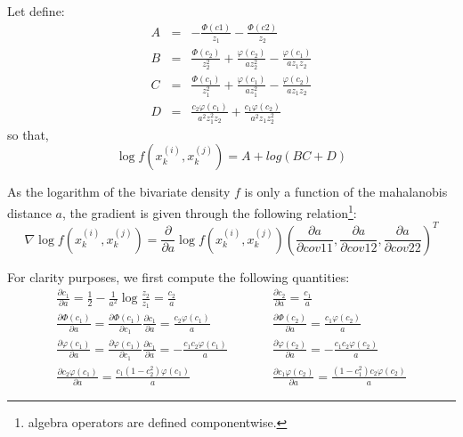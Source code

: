 \documentclass{article}
\begin{document}
Let define:
\begin{eqnarray*}
  A &=& - \frac{\Phi(c1)}{z_1} - \frac{\Phi(c2)}{z_2}\\
  B &=& \frac{\Phi(c_2)}{z_2^2} + \frac{\varphi(c_2)}{az_2^2} -
  \frac{\varphi(c_1)}{az_1z_2}\\
  C &=& \frac{\Phi(c_1)}{z_1^2} + \frac{\varphi(c_1)}{az_1^2} -
  \frac{\varphi(c_2)}{az_1z_2}\\
  D &=& \frac{c_2 \varphi(c_1)}{a^2z_1^2z_2} + \frac{c_1
    \varphi(c_2)}{a^2z_1z_2^2}  
\end{eqnarray*}
so that,
\begin{equation*}
  \log f(x_k^{(i)}, x_k^{(j)}) = A + log(B C + D)
\end{equation*}

As the logarithm of the bivariate density $f$ is only a function of the
mahalanobis distance $a$, the gradient is given through the following
relation\footnote{algebra operators are defined componentwise.}:
\begin{equation*}
  \nabla \log f(x_k^{(i)}, x_k^{(j)}) = \frac{\partial}{\partial a}
  \log f(x_k^{(i)}, x_k^{(j)}) \left( \frac{\partial a}{\partial
      cov{11}}, \frac{\partial a}{\partial cov{12}}, \frac{\partial
      a}{\partial cov{22}} \right)^T
\end{equation*}

For clarity purposes, we first compute the following quantities:
\begin{eqnarray*}
  \frac{\partial c_1}{\partial a} = \frac{1}{2} - \frac{1}{a^2} \log
  \frac{z_2}{z_1} = \frac{c_2}{a} &\qquad& \frac{\partial c_2}{\partial
    a} = \frac{c_1}{a}\\
  \frac{\partial \Phi(c_1)}{\partial a} = \frac{\partial
    \Phi(c_1)}{\partial c_1} \frac{\partial c_1}{\partial a} =
  \frac{c_2 \varphi(c_1)}{a} &\qquad& \frac{\partial
    \Phi(c_2)}{\partial a} = \frac{c_1 \varphi(c_2)}{a}\\
  \frac{\partial \varphi(c_1)}{\partial a} = \frac{\partial
    \varphi(c_1)}{\partial c_1} \frac{\partial c_1}{\partial a} =
  -\frac{c_1c_2 \varphi(c_1)}{a} &\qquad& \frac{\partial
    \varphi(c_2)}{\partial a} = -\frac{c_1c_2 \varphi(c_2)}{a}\\
  \frac{\partial c_2\varphi(c_1)}{\partial a} = \frac{c_1(1 -
    c_2^2)\varphi(c_1)}{a} &\qquad& \frac{\partial
    c_1\varphi(c_2)}{\partial a} = \frac{(1-c_1^2)c_2\varphi(c_2)}{a}
\end{eqnarray*}
\end{document}
